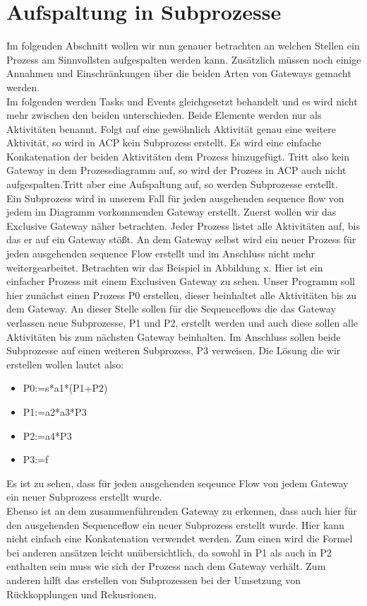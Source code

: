 \section {Aufspaltung in Subprozesse}\label{Aufspaltung in Subprozesse}
Im folgenden Abschnitt wollen wir nun genauer betrachten an welchen Stellen ein Prozess am Sinnvollsten aufgespalten werden kann. Zusätzlich müssen noch einige Annahmen und Einschränkungen über die beiden Arten von Gateways gemacht werden.\\
Im folgenden werden Tasks und Events gleichgesetzt behandelt und es wird nicht mehr zwischen den beiden unterschieden. Beide Elemente werden nur als Aktivitäten benannt. Folgt auf eine gewöhnlich Aktivität genau eine weitere Aktivität, so wird in ACP kein Subprozess erstellt. Es wird eine einfache Konkatenation der beiden Aktivitäten dem Prozess hinzugefügt. Tritt also kein Gateway in dem Prozessdiagramm auf, so wird der Prozess in ACP auch nicht aufgespalten.Tritt aber eine Aufspaltung auf, so werden Subprozesse erstellt.\\
Ein Subprozess wird in unserem Fall für jeden ausgehenden sequence flow von jedem im Diagramm vorkommenden Gateway erstellt. Zuerst wollen wir das Exclusive Gateway näher betrachten. Jeder Prozess listet alle Aktivitäten auf, bis das er auf ein Gateway stößt. An dem Gateway selbst wird ein neuer Prozess für jeden ausgehenden sequence Flow erstellt und im Anschluss nicht mehr weitergearbeitet. Betrachten wir das Beispiel in Abbildung x. Hier ist ein einfacher Prozess mit einem Exclusiven Gateway zu sehen. Unser Programm soll hier zunächst einen Prozess P0 erstellen, dieser beinhaltet alle Aktivitäten bis zu dem Gateway. An dieser Stelle sollen für die Sequenceflows die das Gateway verlassen neue Subprozesse, P1 und P2, erstellt werden und auch diese sollen alle Aktivitäten bis zum nächsten Gateway beinhalten. Im Anschluss sollen beide Subprozesse auf einen weiteren Subprozess, P3 verweisen. Die Lösung die wir erstellen wollen lautet also:\\
\begin{itemize}
\item P0:=s*a1*(P1+P2)
\item P1:=a2*a3*P3
\item P2:=a4*P3
\item P3:=f
\end{itemize}
Es ist zu sehen, dass für jeden ausgehenden seqeunce Flow von jedem Gateway ein neuer Subprozess erstellt wurde.\\ 
Ebenso ist an dem zusammenführenden Gateway zu erkennen, dass auch hier für den ausgehenden Sequenceflow ein neuer Subprozess erstellt wurde. Hier kann nicht einfach eine Konkatenation verwendet werden. Zum einen wird die Formel bei anderen ansätzen leicht unübersichtlich, da sowohl in P1 als auch in P2 enthalten sein muss wie sich der Prozess nach dem Gateway verhält. Zum anderen hilft das erstellen von Subprozessen bei der Umsetzung von Rückkopplungen und Rekusrionen.\\
